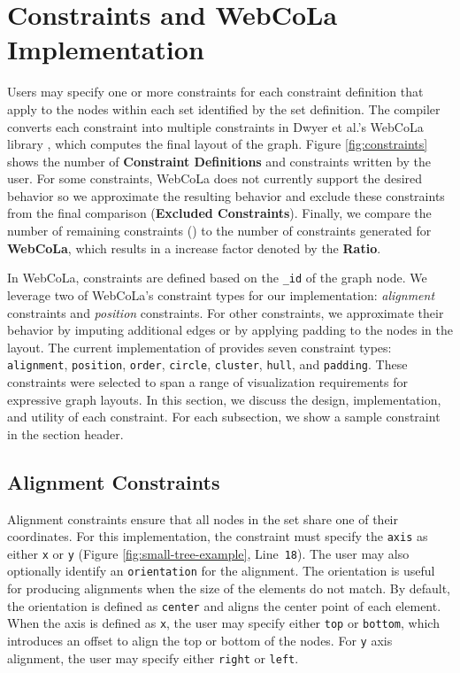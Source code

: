 \section{\projectname Constraints and WebCoLa Implementation}
\label{sec:constraints}
Users may specify one or more constraints for each constraint definition
that apply to the nodes within each set identified by the set definition.
The \projectname compiler converts each \projectname constraint into multiple
constraints in Dwyer et al.'s WebCoLa library \cite{WebCoLa}, which computes
the final layout of the graph. Figure \ref{fig:constraints} shows the number
of \textbf{Constraint Definitions} and \textbf{\projectname} constraints written
by the user. For some \projectname constraints, WebCoLa does not currently
support the desired behavior so we approximate the resulting behavior and 
exclude these constraints from the final comparison (\textbf{Excluded Constraints}). 
Finally, we compare the number of remaining constraints (\textbf{\projectname*}) 
to the number of constraints generated for \textbf{WebCoLa}, which results
in a increase factor denoted by the \textbf{Ratio}.

In WebCoLa, constraints are defined based on the \texttt{\_id} of the graph 
node. We leverage two of WebCoLa's constraint types for our implementation: 
\emph{alignment} constraints and \emph{position} constraints. For other \projectname constraints, we
approximate their behavior by imputing additional edges or by applying
padding to the nodes in the layout. The current implementation of
\projectname provides seven constraint types:
\texttt{alignment}, \texttt{position}, \texttt{order}, \texttt{circle},
\texttt{cluster}, \texttt{hull}, and \texttt{padding}. These constraints
were selected to span a range of visualization requirements for expressive
graph layouts. In this section, we discuss the design, implementation, 
and utility of each \projectname constraint. For each subsection, we show 
a sample \projectname constraint in the section header.

\subsection{Alignment Constraints}
Alignment constraints ensure that all nodes in the set share one of their
coordinates. For this implementation, the constraint must specify the \texttt{axis}
as either \texttt{x} or \texttt{y} (Figure \ref{fig:small-tree-example}, Line~\texttt{18}).
The user may also optionally identify an \texttt{orientation} for the alignment.
The orientation is useful for producing alignments when the size of the
elements do not match. By default, the orientation is defined as \texttt{center}
and aligns the center point of each element. When the axis is defined as \texttt{x},
the user may specify either \texttt{top} or \texttt{bottom}, which introduces
an offset to align the top or bottom of the nodes. For \texttt{y} axis
alignment, the user may specify either \texttt{right} or \texttt{left}.

